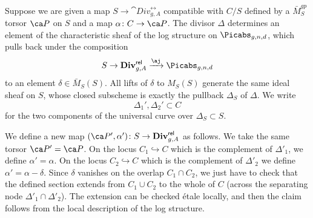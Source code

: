 Suppose we are given a map $S \to \cat{Div}^{\rel}_{g,A}$ compatible with $C/S$ defined by a $\bar M_S^{gp}$ torsor $\ca P$ on $S$ and a map $\alpha\colon C \to \ca P$.
The divisor $\Delta$ determines an element of the characteristic sheaf of the log structure on $\Picabs_{g,n,d}$, which pulls back under the composition $$S \to \cat{Div}^{\rel}_{g,A} \xrightarrow{\aj} \Picabs_{g,n,d}$$
to an element $\delta \in \bar M_S(S)$. All lifts of $\delta$ to $M_S(S)$ generate the same ideal sheaf on $S$, whose closed subscheme is exactly the pullback $\Delta_S$ of $\Delta$.
We write $$\Delta_1', \Delta_2' \subset C$$ for the two components of the universal curve over $\Delta_S \subset S$.



We define a new map $(\ca P', \alpha')\colon S\to \cat{Div}^{\rel}_{g,A}$ as follows. We take the same torsor $\ca P' = \ca P$. On the locus $C_1 \hookrightarrow C$ which is the complement of $\Delta'_1$, we define $\alpha' = \alpha$. On the locus $C_2 \hookrightarrow C$ which is the complement of $\Delta'_2$ we define $\alpha' = \alpha - \delta$. Since $\delta$ vanishes on the overlap $C_1 \cap C_2$, we just have to check that the
defined section extends from $C_1 \cup C_2$ to the whole of $C$ (across the separating node $\Delta'_1 \cap \Delta'_2$). The
extension
can be checked \'etale locally, and then the claim follows from the local description of the log structure.



